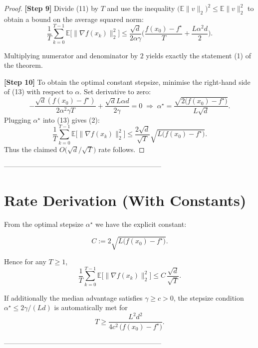 \documentclass{article}
\begin{document}
\begin{proof}
\textbf{[Step 9]} Divide (11) by $T$ and use the inequality
$\big(\mathbb{E}\|v\|_{2}\big)^{2}\le\mathbb{E}\|v\|_{2}^{2}$ to obtain a bound
on the average squared norm:
\[
\frac{1}{T}\sum_{k=0}^{T-1}
\mathbb{E}\!\big[\|\nabla f(x_k)\|_{2}^{2}\big]
\le
\frac{\sqrt{d}}{2\alpha\gamma}
\Big(\frac{f(x_{0})-f^{\star}}{T}
+ \frac{L\alpha^{2}d}{2}\Big).
\tag{13}
\]

Multiplying numerator and denominator by $2$ yields exactly the statement (1)
of the theorem.

\textbf{[Step 10]} To obtain the optimal constant stepsize, minimise the
right‑hand side of (13) with respect to $\alpha$.
Set derivative to zero:
\[
-\frac{\sqrt{d}(f(x_{0})-f^{\star})}{2\alpha^{2}\gamma T}
+ \frac{\sqrt{d}L\alpha d}{2\gamma}=0
\;\Longrightarrow\;
\alpha^{\star}= \frac{\sqrt{2\big(f(x_{0})-f^{\star}\big)}}{L\sqrt{d}} .
\]
Plugging $\alpha^{\star}$ into (13) gives (2):
\[
\frac{1}{T}\sum_{k=0}^{T-1}
\mathbb{E}\!\big[\|\nabla f(x_k)\|_{2}^{2}\big]
\le
\frac{2\sqrt{d}}{\sqrt{T}}
\sqrt{L\big(f(x_{0})-f^{\star}\big)} .
\]
Thus the claimed $O\!\big(\sqrt{d}/\sqrt{T}\big)$ rate follows.
\end{proof}

--------------------------------------------------------------------

\section*{Rate Derivation (With Constants)}
From the optimal stepsize $\alpha^{\star}$ we have the explicit constant:

\[
C:=2\sqrt{L\big(f(x_{0})-f^{\star}\big)}.
\]

Hence for any $T\ge1$,
\[
\frac{1}{T}\sum_{k=0}^{T-1}
\mathbb{E}\!\big[\|\nabla f(x_k)\|_{2}^{2}\big]
\le
C\,\frac{\sqrt{d}}{\sqrt{T}} .
\tag{14}
\]

If additionally the median advantage satisfies $\gamma\ge c>0$, the stepsize
condition $\alpha^{\star}\le 2\gamma/(Ld)$ is automatically met for
\[
T\ge \frac{L^{2}d^{2}}{4c^{2}\,\big(f(x_{0})-f^{\star}\big)} .
\]

--------------------------------------------------------------------
\end{document}
